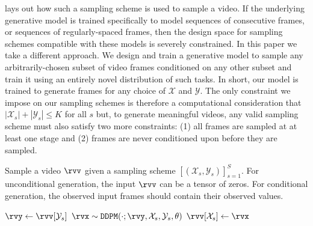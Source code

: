  lays out how such a sampling scheme is used to sample a video. If the underlying generative model is trained specifically to model sequences of consecutive frames, or sequences of regularly-spaced frames, then the design space for sampling schemes compatible with these models is severely constrained. In this paper we take a  different approach.  We design and train a generative model to sample any arbitrarily-chosen subset of video frames conditioned on any other subset and train it using an entirely novel distribution of such tasks. In short, our model is trained to generate frames for any choice of $\mathcal{X}$ and $\mathcal{Y}$. The only constraint we impose on our sampling schemes is therefore a computational consideration that $|\mathcal{X}_s| + |\mathcal{Y}_s| \leq K$ for all $s$ but, to generate meaningful videos, any valid sampling scheme must also satisfy two more constraints: (1) all frames are sampled at at least one stage and (2) frames are never conditioned upon before they are sampled. %

\begin{algorithm}[t]
    \centering
    \caption{Sample a video $\rvv$ given a sampling scheme $[(\mathcal{X}_s,\mathcal{Y}_s)]_{s=1}^S$. For unconditional generation, the input $\rvv$ can be a tensor of zeros. For conditional generation, the observed input frames should contain their observed values.}
    \label{alg:sampling}
    \footnotesize
    \begin{algorithmic}[1]
            \State $\rvy \gets \rvv [\mathcal{Y}_s]$ 
            \State $\rvx \sim  \texttt{DDPM}(\cdot; \rvy, \mathcal{X}_s, \mathcal{Y}_s, \theta)$  
            \State $\rvv [\mathcal{X}_s] \gets \rvx$ 
        \EndFor
    \EndProcedure
    \State \Return {$\rvv$}
    \end{algorithmic}
\end{algorithm}


